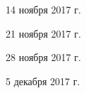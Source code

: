 \documentclass[%
  a4paper,%
  titlepage,%
  11pt%
]{article}%
\begin{document}
    \begin{lecture}{14 ноября 2017 г.}
        
    \end{lecture}

    \begin{lecture}{21 ноября 2017 г.}
        
    \end{lecture}

    \begin{lecture}{28 ноября 2017 г.}
        
    \end{lecture}

    \begin{lecture}{5 декабря 2017 г.}
        
    \end{lecture}
\end{document}
